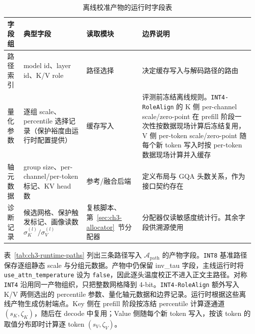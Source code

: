 \begin{table}[!htbp]
  \centering
  \caption{离线校准产物的运行时字段表}
  \label{tab:ch3-calibration-fields}
  \scriptsize
  \setlength{\tabcolsep}{2.8pt}
  \renewcommand{\arraystretch}{1.10}
  \begin{tabularx}{\linewidth}{>{\raggedright\arraybackslash}p{1.45cm}>{\raggedright\arraybackslash}p{2.95cm}>{\raggedright\arraybackslash}p{2.0cm}X}
    \toprule
    字段组 & 典型字段 & 读取模块 & 边界说明 \\
    \midrule
    路径索引 & model id、layer id、K/V role & 路径选择 & 决定缓存写入与解码路径的路由 \\
    量化参数 & 逐组 scale、percentile 选择记录（保护裕度由运行时配置提供） & 缓存写入 & 评测前冻结离线规则。\texttt{INT4-RoleAlign} 的 K 侧 per-channel scale/zero-point 在 prefill 阶段一次性按数据现场计算后冻结复用，V 侧 per-token scale/zero-point 随每个新 token 写入时按 per-token 数据现场计算并入缓存 \\
    轴元数据 & group size、per-channel/per-token 标记、KV head 数 & 参考/融合后端 & 定义布局与 GQA 头数关系，作为接口契约存在 \\
    诊断记录 & 候选网格、保护触发标记、画像读数 $\sigma_K^{(l)}/\sigma_V^{(l)}$ & 复核脚本、第~\ref{sec:ch3-allocator}~节分配器 & 分配器仅读敏感度统计行。其余字段供溯源使用 \\
    \bottomrule
  \end{tabularx}
\end{table}

表~\ref{tab:ch3-runtime-paths} 列出三条路径写入 $\mathcal A_{\mathrm{path}}$ 的产物字段。\texttt{INT8} 基准路径保存逐组静态 scale 与分组元数据。产物中仍保留 inv\_tau 字段，主线运行时将 \texttt{use\_attn\_temperature} 设为 \texttt{false}，因此逐头温度校正不进入正文主路径。对称 \texttt{INT4} 沿用同一产物组织，只把整数网格降到 4-bit。\texttt{INT4-RoleAlign} 额外写入 K/V 两侧选出的 percentile 参数、量化轴元数据和边界记录。运行时根据这些离线产物生成仿射端点。Key 侧在 prefill 阶段按冻结 percentile 计算逐通道 $(s_K,\zeta_K)$，随后在 decode 中复用；Value 侧随每个新 token 写入，按该 token 的取值分布即时计算逐 token $(s_V,\zeta_V)$。

